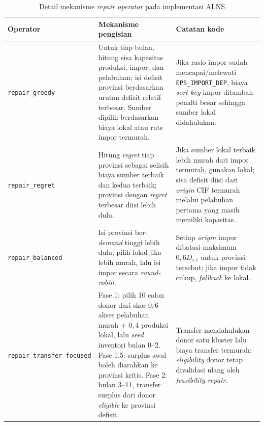 \documentclass{file/TA-ITS}
\theoremstyle{definition}
\theoremstyle{definition}
\theoremstyle{plain}
\begin{document}
\begin{table}[H]
\centering
\caption{Detail mekanisme \textit{repair operator} pada implementasi ALNS}
\label{tab:repair_operator_detail}
\scriptsize
\renewcommand{\arraystretch}{2}
\begin{tabularx}{\textwidth}{@{}p{}p{}X@{}}
\toprule
\textbf{Operator} & \textbf{Mekanisme pengisian} & \textbf{Catatan kode} \\
\midrule
\texttt{repair\_greedy} & Untuk tiap bulan, hitung sisa kapasitas produksi, impor, dan pelabuhan; isi defisit provinsi berdasarkan urutan defisit relatif terbesar. Sumber dipilih berdasarkan biaya lokal atau rute impor termurah. & Jika rasio impor sudah mencapai/melewati \texttt{EPS\_IMPORT\_DEP}, biaya \textit{sort-key} impor ditambah penalti besar sehingga sumber lokal didahulukan. \\
\texttt{repair\_regret} & Hitung \textit{regret} tiap provinsi sebagai selisih biaya sumber terbaik dan kedua terbaik; provinsi dengan \textit{regret} terbesar diisi lebih dulu. & Jika sumber lokal terbaik lebih murah dari impor termurah, gunakan lokal; sisa defisit diisi dari \textit{origin} CIF termurah melalui pelabuhan pertama yang masih memiliki kapasitas. \\
\texttt{repair\_balanced} & Isi provinsi ber-\textit{demand} tinggi lebih dulu; pilih lokal jika lebih murah, lalu isi impor secara \textit{round-robin}. & Setiap \textit{origin} impor dibatasi maksimum $0{,}6D_{i,t}$ untuk provinsi tersebut; jika impor tidak cukup, \textit{fallback} ke lokal. \\
\texttt{repair\_transfer\_focused} & Fase 1: pilih 10 calon donor dari skor $0{,}6$ akses pelabuhan murah + $0{,}4$ produksi lokal, lalu \textit{seed} inventori bulan 0--2. Fase 1.5: surplus awal boleh diarahkan ke provinsi kritis. Fase 2: bulan 3--11, transfer surplus dari donor \textit{eligible} ke provinsi defisit. & Transfer mendahulukan donor satu kluster lalu biaya transfer termurah; \textit{eligibility} donor tetap divalidasi ulang oleh \textit{feasibility repair}. \\
\bottomrule
\end{tabularx}
\renewcommand{\arraystretch}{1}
\end{table}
\end{document}
